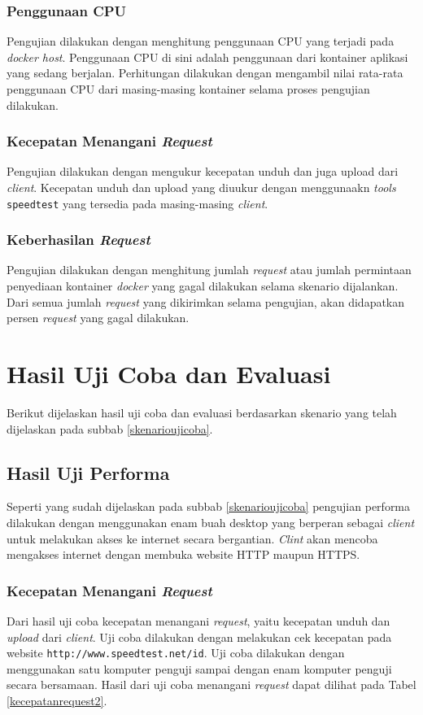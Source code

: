 \subsubsection{Penggunaan CPU}
Pengujian dilakukan dengan menghitung penggunaan CPU yang terjadi pada \textit{docker host}. Penggunaan CPU di sini adalah penggunaan dari kontainer aplikasi yang sedang berjalan. Perhitungan dilakukan dengan mengambil nilai rata-rata penggunaan CPU dari masing-masing kontainer selama proses pengujian dilakukan.	

\subsubsection{Kecepatan Menangani \textit{Request}}
Pengujian dilakukan dengan mengukur kecepatan unduh dan juga upload dari \textit{client}. Kecepatan unduh dan upload yang diuukur dengan menggunaakn \textit{tools} \texttt{speedtest} yang tersedia pada masing-masing \textit{client}.

\subsubsection{Keberhasilan \textit{Request}}
Pengujian dilakukan dengan menghitung jumlah \textit{request} atau jumlah permintaan penyediaan kontainer \textit{docker} yang gagal dilakukan selama skenario dijalankan. Dari semua jumlah \textit{request} yang dikirimkan selama pengujian, akan didapatkan persen \textit{request} yang gagal dilakukan.

\section{Hasil Uji Coba dan Evaluasi}
Berikut dijelaskan hasil uji coba dan evaluasi berdasarkan skenario yang telah dijelaskan pada subbab \ref{skenarioujicoba}.

\subsection{Hasil Uji Performa}
Seperti yang sudah dijelaskan pada subbab \ref{skenarioujicoba} pengujian performa dilakukan dengan menggunakan enam buah desktop yang berperan sebagai \textit{client} untuk melakukan akses ke internet secara bergantian. \textit{Clint} akan mencoba mengakses internet dengan membuka website HTTP maupun HTTPS.

\subsubsection{Kecepatan Menangani \textit{Request}}
Dari hasil uji coba kecepatan menangani \textit{request}, yaitu kecepatan unduh dan \textit{upload} dari \textit{client}. Uji coba dilakukan dengan melakukan cek kecepatan pada website \texttt{http://www.speedtest.net/id}. Uji coba dilakukan dengan menggunakan satu komputer penguji sampai dengan enam komputer penguji secara bersamaan. Hasil dari uji coba menangani \textit{request} dapat dilihat pada Tabel \ref{kecepatanrequest2}.

